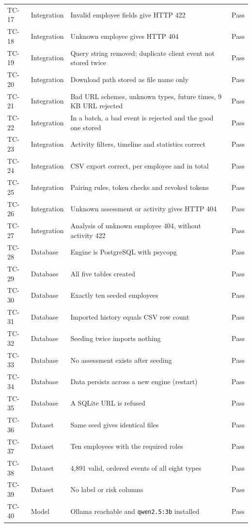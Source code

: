 \documentclass[openany]{tietreport}
\begin{document}
{\begin{xltabular}{\linewidth}{@{}lp{1.7cm}Yl@{}}
TC-17 & Integration & Invalid employee fields give HTTP 422 & Pass \\
TC-18 & Integration & Unknown employee gives HTTP 404 & Pass \\
TC-19 & Integration & Query string removed; duplicate client event not stored twice & Pass \\
TC-20 & Integration & Download path stored as file name only & Pass \\
TC-21 & Integration & Bad URL schemes, unknown types, future times, 9\,KB URL rejected & Pass \\
TC-22 & Integration & In a batch, a bad event is rejected and the good one stored & Pass \\
TC-23 & Integration & Activity filters, timeline and statistics correct & Pass \\
TC-24 & Integration & CSV export correct, per employee and in total & Pass \\
TC-25 & Integration & Pairing rules, token checks and revoked tokens & Pass \\
TC-26 & Integration & Unknown assessment or activity gives HTTP 404 & Pass \\
TC-27 & Integration & Analysis of unknown employee 404, without activity 422 & Pass \\
TC-28 & Database & Engine is PostgreSQL with psycopg & Pass \\
TC-29 & Database & All five tables created & Pass \\
TC-30 & Database & Exactly ten seeded employees & Pass \\
TC-31 & Database & Imported history equals CSV row count & Pass \\
TC-32 & Database & Seeding twice imports nothing & Pass \\
TC-33 & Database & No assessment exists after seeding & Pass \\
TC-34 & Database & Data persists across a new engine (restart) & Pass \\
TC-35 & Database & A SQLite URL is refused & Pass \\
TC-36 & Dataset & Same seed gives identical files & Pass \\
TC-37 & Dataset & Ten employees with the required roles & Pass \\
TC-38 & Dataset & 4,891 valid, ordered events of all eight types & Pass \\
TC-39 & Dataset & No label or risk columns & Pass \\
TC-40 & Model & Ollama reachable and \texttt{qwen2.5:3b} installed & Pass \\

\end{xltabular}}
\end{document}
